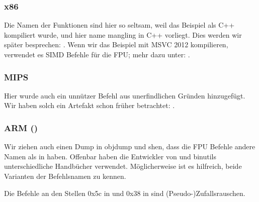 

\subsubsection{x86}


Die Namen der Funktionen sind hier so seltsam, weil das Beispiel als C++ kompiliert wurde, und hier name mangling in C++
vorliegt. Dies werden wir später besprechen: .
Wenn wir das Beispiel mit MSVC 2012 kompilieren, verwendet es SIMD Befehle für die FPU; mehr dazu unter:
.

\subsubsection{MIPS}


Hier wurde auch ein unnützer  Befehl aus unerfindlichen Gründen hinzugefügt.
Wir haben solch ein Artefakt schon früher betrachtet: .

\subsubsection{ARM (\ARMMode)}



Wir ziehen auch einen Dump in objdump und shen, dass die FPU Befehle andere Namen als in \IDA haben.
Offenbar haben die Entwickler von \IDA und binutils unterschiedliche Handbücher verwendet.
Möglicherweise ist es hilfreich, beide Varianten der Befehlsnamen zu kennen.



Die Befehle an den Stellen 0x5c in  und 0x38 in \main sind (Pseudo-)Zufallsrauschen.

